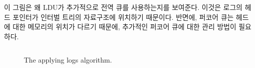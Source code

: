 이 그림은 왜 LDU가 추가적으로 전역 큐를 사용하는지를 보여준다. 
이것은 로그의 헤드 포인터가 인터벌 트리의 자료구조에 위치하기 때문이다.
반면에, 퍼코어 큐는 헤드에 대한 메모리의 위치가 다르기 때문에, 
추가적인 퍼코어 큐에 대한 관리 방법이 필요하다. 



\begin{figure}[h]
\begin{center}
\inputminted[linenos,fontsize=\footnotesize,
tabsize=4]{c}{src/ldu_queue_global.c}
\end{center}
\caption{The \LDU applying logs algorithm.}
\label{fig:glduphysicalupdate}
\end{figure}

